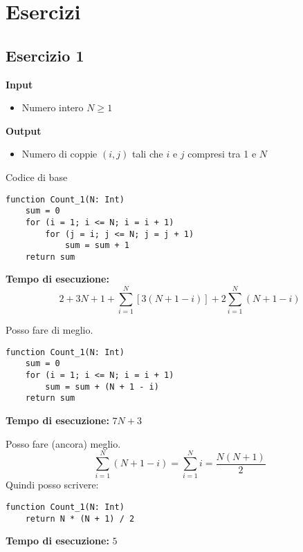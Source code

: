 \documentclass{article}
\begin{document}
\section{Esercizi}
\subsection{Esercizio 1}
\large\textbf{Input}
\begin{itemize}
    \item Numero intero \(N \geq 1\)
\end{itemize}

\noindent\large\textbf{Output}
\begin{itemize}
    \item Numero di coppie \((i,j)\) tali che \(i\) e \(j\) compresi tra 1 e \(N\)
\end{itemize}

\noindent Codice di base
\begin{center}
    \begin{verbatim}
function Count_1(N: Int)
    sum = 0
    for (i = 1; i <= N; i = i + 1)
        for (j = i; j <= N; j = j + 1)
            sum = sum + 1
    return sum
\end{verbatim}
\end{center}
\textbf{Tempo di esecuzione: }
\[2 + 3N + 1 + \sum_{i = 1}^N \left[3\left(N + 1 - i\right)\right] + 2 \sum_{i = 1}^N \left(N + 1 - i\right)\]

\vspace{1.5cm}

\noindent Posso fare di meglio.
\begin{center}
    \begin{verbatim}
function Count_1(N: Int)
    sum = 0
    for (i = 1; i <= N; i = i + 1)
        sum = sum + (N + 1 - i)
    return sum
\end{verbatim}
\end{center}
\textbf{Tempo di esecuzione: } \(7N + 3\)

\vspace{1.5cm}

\noindent Posso fare (ancora) meglio.
\[\sum_{i=1}^N (N + 1 - i) = \sum_{i = 1}^N i = \frac{N(N + 1)}{2}\]
Quindi posso scrivere:
\begin{center}
    \begin{verbatim}
function Count_1(N: Int)
    return N * (N + 1) / 2
\end{verbatim}
\end{center}
\textbf{Tempo di esecuzione: } \(5\)
\end{document}
